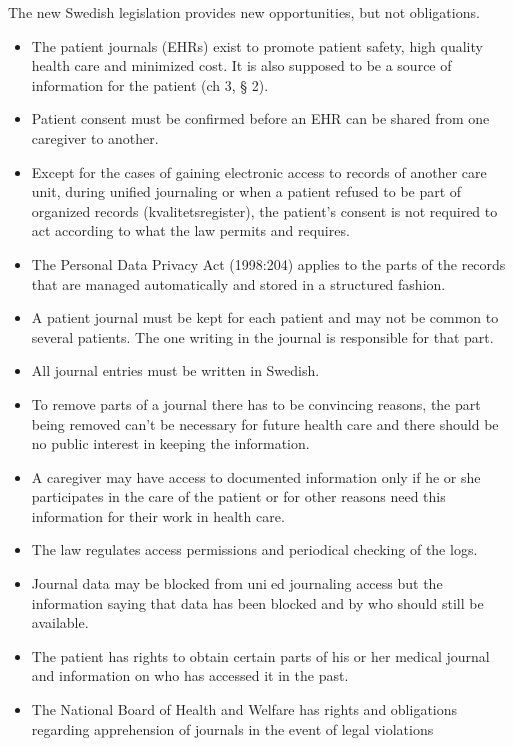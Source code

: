 \documentclass[14pt]{article}
\begin{document}
The new Swedish legislation provides new opportunities, but not obligations. \cite{RiR19}

\begin{itemize}
\item The patient journals (EHRs) exist to promote patient safety, high quality health
care and minimized cost. It is also supposed to be a source of information for the
patient (ch 3, § 2).
\item Patient consent must be confirmed before an EHR can be shared from one caregiver
to another.
\item Except for the cases of gaining electronic access to records of another care unit,
during unified journaling or when a patient refused to be part of organized records
(kvalitetsregister), the patient's consent is not required to act according to what
the law permits and requires.
\item The Personal Data Privacy Act (1998:204) applies to the parts of the records that
are managed automatically and stored in a structured fashion.
\item A patient journal must be kept for each patient and may not be common to several
patients. The one writing in the journal is responsible for that part.
\item All journal entries must be written in Swedish.
\item To remove parts of a journal there has to be convincing reasons, the part being
removed can't be necessary for future health care and there should be no public
interest in keeping the information.
\item A caregiver may have access to documented information only if he or she participates
in the care of the patient or for other reasons need this information for their
work in health care.
\item The law regulates access permissions and periodical checking of the logs.
\item Journal data may be blocked from unied journaling access but the information
saying that data has been blocked and by who should still be available.
\item The patient has rights to obtain certain parts of his or her medical journal and
information on who has accessed it in the past.
\item The National Board of Health and Welfare has rights and obligations regarding
apprehension of journals in the event of legal violations
\end{itemize}
\end{document}
